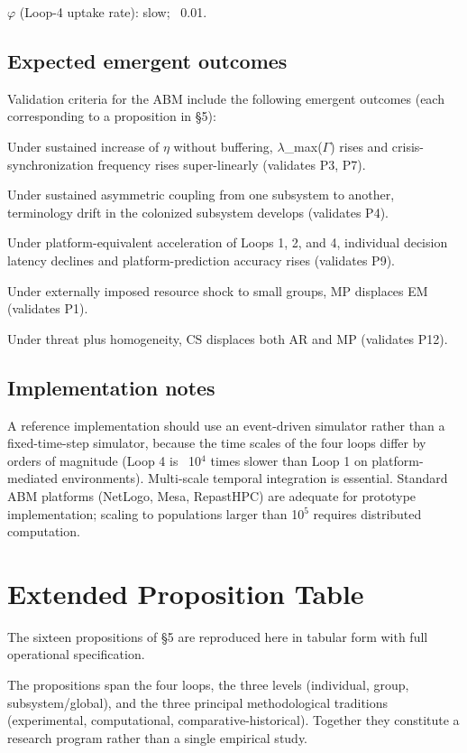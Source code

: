 \documentclass[12pt,a4paper]{article}
\begin{document}
$\varphi$ (Loop-4 uptake rate): slow; ~0.01.

\subsection{Expected emergent outcomes}

Validation criteria for the ABM include the following emergent outcomes (each corresponding to a proposition in §5):


Under sustained increase of $\eta$ without buffering, $\lambda$_max($\Gamma$) rises and crisis-synchronization frequency rises super-linearly (validates P3, P7).

Under sustained asymmetric coupling from one subsystem to another, terminology drift in the colonized subsystem develops (validates P4).

Under platform-equivalent acceleration of Loops 1, 2, and 4, individual decision latency declines and platform-prediction accuracy rises (validates P9).

Under externally imposed resource shock to small groups, MP displaces EM (validates P1).

Under threat plus homogeneity, CS displaces both AR and MP (validates P12).

\subsection{Implementation notes}

A reference implementation should use an event-driven simulator rather than a fixed-time-step simulator, because the time scales of the four loops differ by orders of magnitude (Loop 4 is ~10$^4$ times slower than Loop 1 on platform-mediated environments). Multi-scale temporal integration is essential. Standard ABM platforms (NetLogo, Mesa, RepastHPC) are adequate for prototype implementation; scaling to populations larger than 10$^5$ requires distributed computation.




\section{Extended Proposition Table}
\label{app:c}

The sixteen propositions of §5 are reproduced here in tabular form with full operational specification.



The propositions span the four loops, the three levels (individual, group, subsystem/global), and the three principal methodological traditions (experimental, computational, comparative-historical). Together they constitute a research program rather than a single empirical study.
\end{document}
